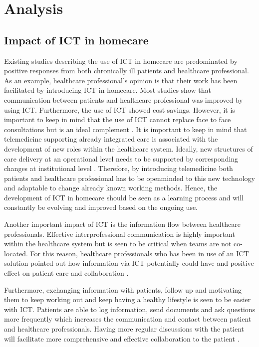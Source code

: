 \chapter{Analysis}

\label{analysis}

\section{Impact of ICT in homecare}
Existing studies describing the use of ICT in homecare are predominated by positive responses from both chronically ill patients and healthcare professional. As an example, healthcare professional’s opinion is that their work has been facilitated by introducing ICT in homecare. Most studies show that communication between patients and healthcare professional was improved by using ICT. Furthermore, the use of ICT showed cost savings. However, it is important to keep in mind that the use of ICT cannot replace face to face consultations but is an ideal complement \cite{ICT}. It is important to keep in mind that telemedicine supporting already integrated care is associated with the development of new roles within the healthcare system. Ideally, new structures of care delivery at an operational level needs to be supported by corresponding changes at institutional level \cite{countries}. Therefore, by introducing telemedicine both patients and healthcare professional has to be openminded to this new technology and adaptable to change already known working methods. Hence, the development of ICT in homecare should be seen as a learning process and will constantly be evolving and improved based on the ongoing use. 

Another important impact of ICT is the information flow between healthcare professionals. Effective interprofessional communication is highly important within the healthcare system but is seen to be critical when teams are not co-located. For this reason, healthcare professionals who has been in use of an ICT solution pointed out how information via ICT potentially could have and positive effect on patient care and collaboration \cite{barrier}.

Furthermore, exchanging information with patients, follow up and motivating them to keep working out and keep having a healthy lifestyle is seen to be easier with ICT. Patients are able to log information, send documents and ask questions more frequently which increases the communication and contact between patient and healthcare professionals. Having more regular discussions with the patient will facilitate more comprehensive and effective collaboration to the patient \cite{barrier}.

